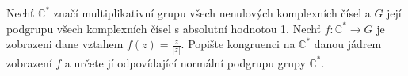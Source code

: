 Nechť $\mathbb{C}^{*}$ značí multiplikativní grupu všech nenulových komplexních čísel
a $G$ její podgrupu všech komplexních čísel s absolutní hodnotou 1. Nechť
$f:\mathbb{C}^{*} \rightarrow G$ je zobrazeni dane vztahem $f(z) =
\frac{z}{|z|}$. Popište kongruenci na $\mathbb{C}^{*}$ danou jádrem zobrazení
$f$ a určete jí odpovídající normální podgrupu grupy $\mathbb{C}^{*}$.
